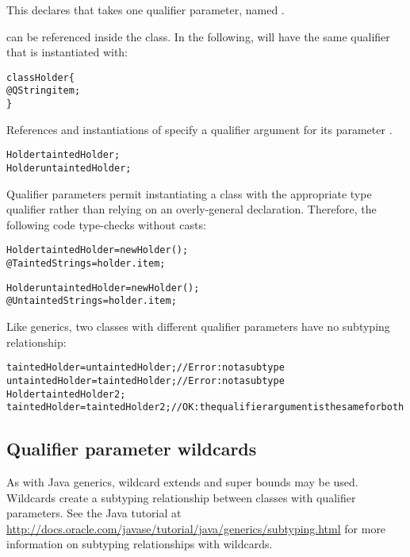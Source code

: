 \noindent
This declares that  takes one qualifier parameter, named
.

 can be referenced inside the  class. In the
following,  will have the same qualifier that  is
instantiated with:

\begin{alltt}
    class Holder  \{
        @Q String item;
    \}
\end{alltt}

References and instantiations of  specify a qualifier
argument for its parameter .

\begin{alltt}
    Holder taintedHolder;
    Holder untaintedHolder;
\end{alltt}

Qualifier parameters permit instantiating a class with the appropriate type
qualifier rather than relying on an overly-general declaration.  Therefore,
the following code type-checks without casts:

\begin{alltt}
    Holder taintedHolder = new Holder();
    @Tainted String s = holder.item;

    Holder untaintedHolder = new Holder();
    @Untainted String s = holder.item;
\end{alltt}

Like generics, two classes with different
qualifier parameters have no subtyping relationship:

\begin{alltt}
    taintedHolder = untaintedHolder;     // Error: not a subtype
    untaintedHolder = taintedHolder;     // Error: not a subtype
    Holder taintedHolder2;
    taintedHolder = taintedHolder2;      // OK:  the qualifier argument is the same for both
\end{alltt}



\subsection{Qualifier parameter wildcards\label{qualifier-parameters-wildcards}}

As with Java generics, wildcard extends and super bounds may
be used. Wildcards create a subtyping relationship between classes with
qualifier parameters. See the Java tutorial at
\url{http://docs.oracle.com/javase/tutorial/java/generics/subtyping.html}
for more information on subtyping relationships with wildcards.

